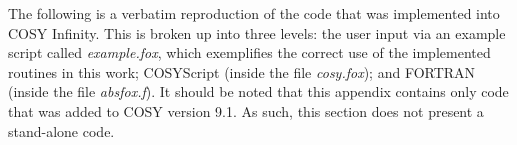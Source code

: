The following is a verbatim reproduction of the code that was implemented into COSY Infinity. This is broken up into three levels: the user input via an example script called \textit{example.fox}, which exemplifies the correct use of the implemented routines in this work; COSYScript (inside the file \textit{cosy.fox}); and FORTRAN (inside the file \textit{absfox.f}). It should be noted that this appendix contains only code that was added to COSY version 9.1. As such, this section does not present a stand-alone code.


\makeatletter
\newcommand{\ProcessDigit}[1]
{%
  \ifnum\lst@mode=\lst@Pmode\relax%
   {\color{dred} #1}%
  \else
    #1%
  \fi
}
\makeatletter
\newcommand{\ProcessOperator}[1]
{%
  \ifnum\lst@mode=\lst@Pmode\relax%
   {\color{lblue} #1}%
  \else
    #1%
  \fi
}

